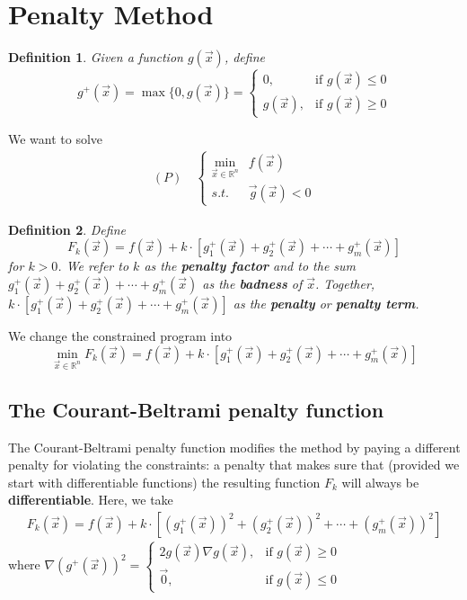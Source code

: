 \documentclass[11pt,a4paper]{article}
\newtheorem{definition}{Definition}
\begin{document}
\section{Penalty Method}
\begin{definition}
    Given a function $g(\vec{x})$, define $$g^+(\vec{x})=\max\{0,g(\vec{x})\}=\left\{\begin{matrix}
        0,&\text{if }g(\vec{x})\leq 0\\
        g(\vec{x}),&\text{if }g(\vec{x})\geq 0
    \end{matrix}\right.$$
\end{definition}
We want to solve
\begin{equation}
    \begin{aligned}(P)\quad
        \left\{\begin{matrix}
        \min_{\vec{x}\in \mathbb{R}^n}& f(\vec{x})\\
        s.t.& \vec{g}(\vec{x})<0
        \end{matrix}\right.
    \end{aligned}
    \nonumber
\end{equation}
\begin{definition}
Define $$F_k(\vec{x})=f(\vec{x})+k\cdot\left[g_1^+(\vec{x})+g_2^+(\vec{x})+\cdots+g_m^+(\vec{x})\right]$$
for $k>0$. We refer to $k$ as the \textbf{penalty factor} and to the sum $g_1^+(\vec{x})+g_2^+(\vec{x})+\cdots+g_m^+(\vec{x})$ as the \textbf{badness} of $\vec{x}$. Together, $k\cdot\left[g_1^+(\vec{x})+g_2^+(\vec{x})+\cdots+g_m^+(\vec{x})\right]$ as the \textbf{penalty} or \textbf{penalty term}.
\end{definition}
We change the constrained program into $$\min_{\vec{x}\in \mathbb{R}^n}F_k(\vec{x})=f(\vec{x})+k\cdot\left[g_1^+(\vec{x})+g_2^+(\vec{x})+\cdots+g_m^+(\vec{x})\right]$$

\subsection{The Courant-Beltrami penalty function}
The Courant-Beltrami penalty function modifies the method by paying a different penalty for violating the constraints: a penalty that makes sure that (provided we start with differentiable functions) the resulting function $F_k$ will always be \textbf{differentiable}. Here, we take
\begin{equation}
    \begin{aligned}
        F_k(\vec{x})=f(\vec{x})+k\cdot\left[\left(g_1^+(\vec{x})\right)^2+\left(g_2^+(\vec{x})\right)^2+\cdots+\left(g_m^+(\vec{x})\right)^2\right]
    \end{aligned}
    \nonumber
\end{equation}
where $\nabla \left(g^+(\vec{x})\right)^2=\left\{\begin{matrix}
    2g(\vec{x})\nabla g(\vec{x}),&\text{if }g(\vec{x})\geq 0\\
    \vec{0},&\text{if }g(\vec{x})\leq 0
\end{matrix}\right.$
\end{document}
